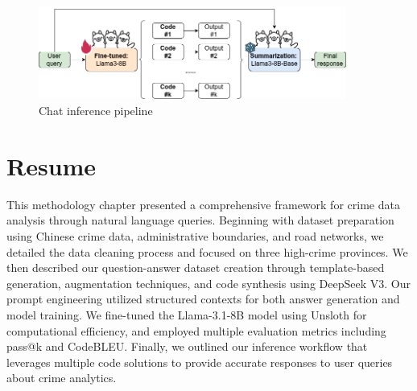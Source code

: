 \begin{figure}[H]
  \centering
  \includegraphics[width=0.9\textwidth]{images/inference_pipeline.drawio.png}
  \caption{Chat inference pipeline}
  \label{fig:inference_pipeline}
\end{figure}

\section{Resume}

This methodology chapter presented a comprehensive framework for crime data analysis through natural language queries. Beginning with dataset preparation using Chinese crime data, administrative boundaries, and road networks, we detailed the data cleaning process and focused on three high-crime provinces. We then described our question-answer dataset creation through template-based generation, augmentation techniques, and code synthesis using DeepSeek V3. Our prompt engineering utilized structured contexts for both answer generation and model training. We fine-tuned the Llama-3.1-8B model using Unsloth for computational efficiency, and employed multiple evaluation metrics including pass@k and CodeBLEU. Finally, we outlined our inference workflow that leverages multiple code solutions to provide accurate responses to user queries about crime analytics.
